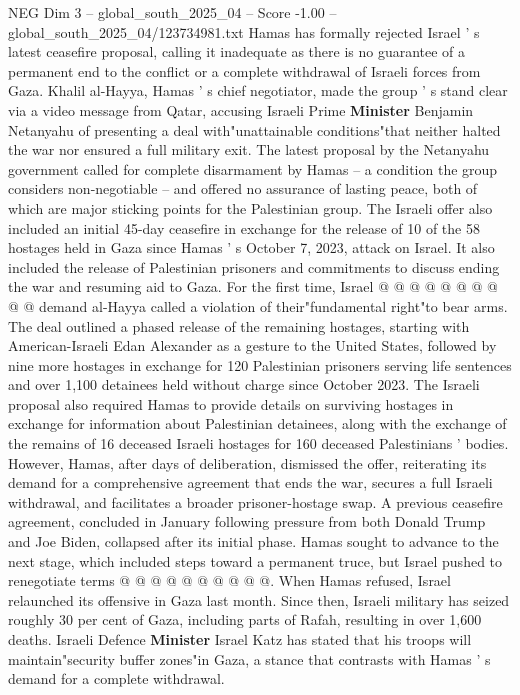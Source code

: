 \begin{textsample}{NEG Dim 3 – global\_south\_2025\_04 – Score -1.00 – global\_south\_2025\_04/123734981.txt}  \label{ex:f3_neg_342}
Hamas has formally rejected Israel ' s latest ceasefire proposal, calling it inadequate as there is no guarantee of a permanent end to the conflict or a complete withdrawal of Israeli forces from Gaza.
Khalil al-Hayya, Hamas ' s chief negotiator, made the group ' s stand clear via a video message from Qatar, accusing Israeli Prime \textbf{Minister} Benjamin Netanyahu of presenting a deal with"unattainable conditions"that neither halted the war nor ensured a full military exit.
The latest proposal by the Netanyahu government called for complete disarmament by Hamas -- a condition the group considers non-negotiable -- and offered no assurance of lasting peace, both of which are major sticking points for the Palestinian group.
The Israeli offer also included an initial 45-day ceasefire in exchange for the release of 10 of the 58 hostages held in Gaza since Hamas ' s October 7, 2023, attack on Israel.
It also included the release of Palestinian prisoners and commitments to discuss ending the war and resuming aid to Gaza.
For the first time, Israel @ @ @ @ @ @ @ @ @ @ demand al-Hayya called a violation of their"fundamental right"to bear arms.
The deal outlined a phased release of the remaining hostages, starting with American-Israeli Edan Alexander as a gesture to the United States, followed by nine more hostages in exchange for 120 Palestinian prisoners serving life sentences and over 1,100 detainees held without charge since October 2023.
The Israeli proposal also required Hamas to provide details on surviving hostages in exchange for information about Palestinian detainees, along with the exchange of the remains of 16 deceased Israeli hostages for 160 deceased Palestinians ' bodies.
However, Hamas, after days of deliberation, dismissed the offer, reiterating its demand for a comprehensive agreement that ends the war, secures a full Israeli withdrawal, and facilitates a broader prisoner-hostage swap.
A previous ceasefire agreement, concluded in January following pressure from both Donald Trump and Joe Biden, collapsed after its initial phase.
Hamas sought to advance to the next stage, which included steps toward a permanent truce, but Israel pushed to renegotiate terms @ @ @ @ @ @ @ @ @ @.
When Hamas refused, Israel relaunched its offensive in Gaza last month.
Since then, Israeli military has seized roughly 30 per cent of Gaza, including parts of Rafah, resulting in over 1,600 deaths.
Israeli Defence \textbf{Minister} Israel Katz has stated that his troops will maintain"security buffer zones"in Gaza, a stance that contrasts with Hamas ' s demand for a complete withdrawal.

\end{textsample}
